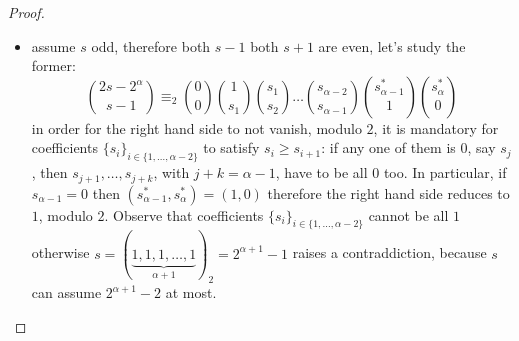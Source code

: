 \begin{proof}
\begin{itemize}
\begin{itemize}
            \item assume $s$ odd, therefore both $s-1$ both $s+1$ are even, 
                let's study the former:
                \begin{displaymath}
                        {{2s-2^{{\alpha}}}\choose{s-1}}  
                        \equiv_{2}
                        {{0}\choose{0}} 
                        {{1}\choose{s_{1}}}
                        {{s_{1}}\choose{s_{2}}}
                        \ldots
                        {{s_{{\alpha}-2}}\choose{s_{{\alpha}-1}}}
                        {{s_{{\alpha}-1}^{*}}\choose{1}}
                        {{s_{{\alpha}}^{*}}\choose{0}}
                \end{displaymath}
                in order for the right hand side to not vanish, modulo $2$,
                it is mandatory for coefficients $\lbrace s_{i}\rbrace_{i\in\lbrace1,\ldots,{\alpha}-2\rbrace}$
                to satisfy $s_{i}\geq s_{i+1}$: if any one of them is $0$, say $s_{j}$, then
                $s_{j+1},\ldots,s_{j+k}$, with $j+k={\alpha}-1$,
                have to be all $0$ too. In particular, if $s_{{\alpha}-1}=0$ then 
                $(s_{{\alpha}-1}^{*},s_{{\alpha}}^{*})=(1,0)$
                therefore the right hand side reduces to $1$, modulo $2$.
                Observe that coefficients $\lbrace s_{i}\rbrace_{i\in\lbrace1,\ldots,{\alpha}-2\rbrace}$
                cannot be all $1$ otherwise 
                $s=(\underbrace{1,1,1,\ldots,1}_{{\alpha}+1})_{2}=2^{{\alpha}+1}-1$ raises a contraddiction, because
                $s$ can assume $2^{{\alpha}+1}-2$ at most. 
                

\end{itemize}
\end{itemize}
\end{proof}
